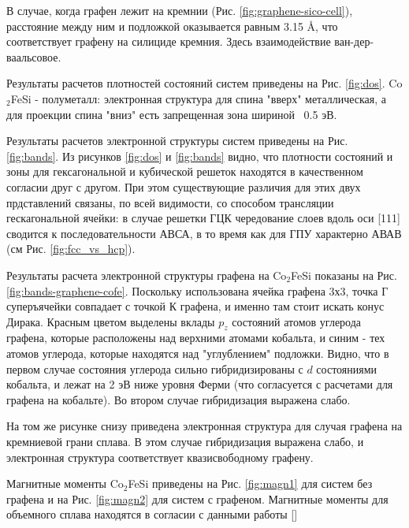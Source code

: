 В случае, когда графен лежит на кремнии (Рис. \ref{fig:graphene-sico-cell}), расстояние между ним и подложкой оказывается равным 3.15 Å, что соответствует графену на силициде кремния. Здесь взаимодействие ван-дер-ваальсовое.



Результаты расчетов плотностей состояний систем приведены на Рис. \ref{fig:dos}. Co$_2$FeSi - полуметалл: электронная структура для спина "вверх" металлическая, а для проекции спина "вниз" есть запрещенная зона шириной ~0.5 эВ. 

Результаты расчетов электронной структуры систем приведены на Рис. \ref{fig:bands}. Из рисунков \ref{fig:dos} и \ref{fig:bands} видно, что плотности состояний и зоны для гексагональной и кубической решеток находятся в качественном согласии друг с другом. При этом существующие различия для этих двух прдставлений связаны, по всей видимости, со способом трансляции гескагональной ячейки: в случае  решетки ГЦК чередование слоев вдоль оси [111] сводится к последовательности АВСА, в то время как для ГПУ характерно АВАВ (см Рис. \ref{fig:fcc_vs_hcp}). 

Результаты расчета электронной структуры графена на Co$_2$FeSi показаны на Рис. \ref{fig:bands-graphene-cofe}. Поскольку использована ячейка графена 3х3, точка Г суперъячейки совпадает с точкой К графена, и именно там стоит искать конус Дирака. Красным цветом выделены вклады $p_z$ состояний атомов углерода графена, которые расположены над верхними атомами кобальта, и синим - тех атомов углерода, которые находятся над "углублением" подложки. Видно, что в первом случае состояния углерода сильно гибридизированы с $d$ состояниями кобальта, и лежат на 2 эВ ниже уровня Ферми (что согласуется с расчетами для графена на кобальте). Во втором случае гибридизация выражена слабо. 

На том же рисунке снизу приведена электронная структура для случая графена на кремниевой грани сплава. В этом случае гибридизация выражена слабо, и электронная структура соответствует квазисвободному графену.

Магнитные моменты Co$_2$FeSi приведены на Рис. \ref{fig:magn1} для систем без графена и на Рис. \ref{fig:magn2} для систем с графеном. Магнитные моменты для объемного сплава находятся в согласии с данными работы []

